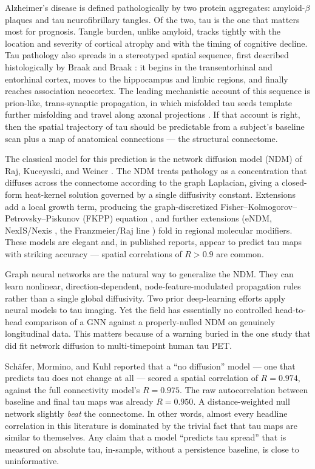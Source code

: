 \documentclass{article}
\begin{document}
Alzheimer's disease is defined pathologically by two protein aggregates: amyloid-$\beta$ plaques and tau neurofibrillary tangles. Of the two, tau is the one that matters most for prognosis. Tangle burden, unlike amyloid, tracks tightly with the location and severity of cortical atrophy and with the timing of cognitive decline. Tau pathology also spreads in a stereotyped spatial sequence, first described histologically by Braak and Braak \cite{braak1991}: it begins in the transentorhinal and entorhinal cortex, moves to the hippocampus and limbic regions, and finally reaches association neocortex. The leading mechanistic account of this sequence is prion-like, trans-synaptic propagation, in which misfolded tau seeds template further misfolding and travel along axonal projections \cite{kaufman2018}. If that account is right, then the spatial trajectory of tau should be predictable from a subject's baseline scan plus a map of anatomical connections --- the structural connectome.

The classical model for this prediction is the network diffusion model (NDM) of Raj, Kuceyeski, and Weiner \cite{raj2012}. The NDM treats pathology as a concentration that diffuses across the connectome according to the graph Laplacian, giving a closed-form heat-kernel solution governed by a single diffusivity constant. Extensions add a local growth term, producing the graph-discretized Fisher--Kolmogorov--Petrovsky--Piskunov (FKPP) equation \cite{fkpp}, and further extensions (eNDM, NexIS/Nexis \cite{anand2022}, the Franzmeier/Raj line \cite{franzmeier2020}) fold in regional molecular modifiers. These models are elegant and, in published reports, appear to predict tau maps with striking accuracy --- spatial correlations of $R > 0.9$ are common.

Graph neural networks are the natural way to generalize the NDM. They can learn nonlinear, direction-dependent, node-feature-modulated propagation rules rather than a single global diffusivity. Two prior deep-learning efforts \cite{dai2020, tauflownet2024} apply neural models to tau imaging. Yet the field has essentially no controlled head-to-head comparison of a GNN against a properly-nulled NDM on genuinely longitudinal data. This matters because of a warning buried in the one study that did fit network diffusion to multi-timepoint human tau PET.

Sch\"afer, Mormino, and Kuhl \cite{schafer2020} reported that a ``no diffusion'' model --- one that predicts tau does not change at all --- scored a spatial correlation of $R = 0.974$, against the full connectivity model's $R = 0.975$. The raw autocorrelation between baseline and final tau maps was already $R = 0.950$. A distance-weighted null network slightly \textit{beat} the connectome. In other words, almost every headline correlation in this literature is dominated by the trivial fact that tau maps are similar to themselves. Any claim that a model ``predicts tau spread'' that is measured on absolute tau, in-sample, without a persistence baseline, is close to uninformative.
\end{document}
